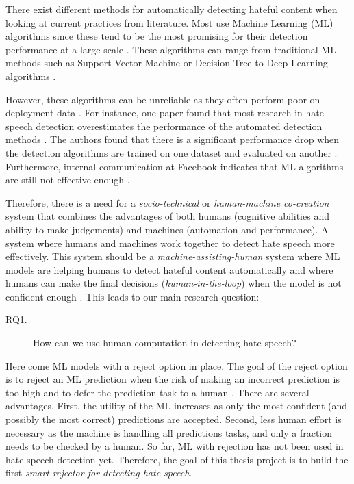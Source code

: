 There exist different methods for automatically detecting hateful content when looking at current practices from literature. Most use Machine Learning (ML) algorithms since these tend to be the most promising for their detection performance at a large scale \cite{balayn2021automatic, fortuna2018survey}. These algorithms can range from traditional ML methods such as Support Vector Machine or Decision Tree to Deep Learning algorithms \cite{fortuna2018survey}.

However, these algorithms can be unreliable as they often perform poor on deployment data \cite{balayn2021automatic}. For instance, one paper found that most research in hate speech detection overestimates the performance of the automated detection methods \cite{arango2019hate}. The authors found that there is a significant performance drop when the detection algorithms are trained on one dataset and evaluated on another \cite{arango2019hate}. Furthermore, internal communication at Facebook indicates that ML algorithms are still not effective enough \cite{noah2021giansiracusa}.

Therefore, there is a need for a \textit{socio-technical} or \textit{human-machine co-creation} \cite{woo2020future} system that combines the advantages of both humans (cognitive abilities and ability to make judgements) and machines (automation and performance). A system where humans and machines work together to detect hate speech more effectively. This system should be a \textit{machine-assisting-human} system where ML models are helping humans to detect hateful content automatically and where humans can make the final decisions (\textit{human-in-the-loop}) when the model is not confident enough \cite{woo2020future}. This leads to our main research question:

\begin{description}
	\item[RQ1.] How can we use human computation in detecting hate speech?
\end{description}

Here come ML models with a reject option in place. The goal of the reject option is to reject an ML prediction when the risk of making an incorrect prediction is too high and to defer the prediction task to a human \cite{hendrickx2021machine}. There are several advantages. First, the utility of the ML increases as only the most confident (and possibly the most correct) predictions are accepted. Second, less human effort is necessary as the machine is handling all predictions tasks, and only a fraction needs to be checked by a human. So far, ML with rejection has not been used in hate speech detection yet. Therefore, the goal of this thesis project is to build the first \textit{smart rejector for detecting hate speech}. 

